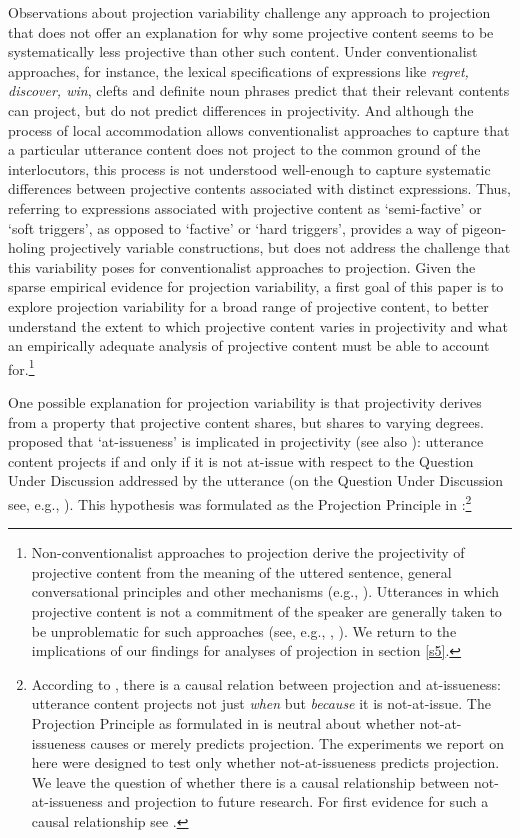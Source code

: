 \documentclass[11pt,fleqn]{article}
\newcommand{\6}{\mbox{$[\hspace*{-.6mm}[$}}
\newcommand{\9}{\mbox{$]\hspace*{-.6mm}]$}}
\begin{document}
Observations about projection variability challenge any approach to projection that does not offer an explanation for why some projective content seems to be systematically less projective than other such content. Under conventionalist approaches, for instance, the lexical specifications of expressions like {\em regret, discover, win}, clefts and definite noun phrases predict that their relevant contents can project, but do not predict differences in projectivity. And although the process of local accommodation allows conventionalist approaches to capture that a particular utterance content does not project to the common ground of the interlocutors, this process is not understood well-enough to capture systematic differences between projective contents associated with distinct expressions. Thus, referring to expressions associated with projective content as `semi-factive' or `soft triggers', as opposed to `factive' or `hard triggers', provides a way of pigeon-holing projectively variable constructions, but does not address the challenge that this variability poses for conventionalist approaches to projection.  Given the sparse empirical evidence for projection variability, a first goal of this paper is to explore projection variability for a broad range of projective content, to better understand the extent to which projective content varies in projectivity and what an empirically adequate analysis of projective content must be able to account for.\footnote{Non-conventionalist approaches to projection derive the projectivity of projective content from the meaning of the uttered sentence, general conversational principles and other mechanisms (e.g., \citealt{stalnaker74,kempson75,levinson83,simons01,abusch10,best-question}). Utterances in which projective content is not a commitment of the speaker are generally taken to be unproblematic for such approaches (see, e.g., \citealt[ch.4]{levinson83}, \citealt[ch.11]{kadmon01}). We return to  the implications of our findings for analyses of projection in section \ref{s5}.}

One possible explanation for projection variability is that projectivity derives from a property that projective content shares, but shares to varying degrees. \citet{brst-salt10} proposed that `at-issueness' is implicated in projectivity (see also \citealt{abrusan2011}): utterance content projects if and only if it is not at-issue with respect to the Question Under Discussion addressed by the utterance (on the Question Under Discussion see, e.g., \citealt{roberts12}). This hypothesis was formulated as the Projection Principle in \citealt[280]{brst-ar}:\footnote{According to \citealt[315]{brst-salt10}, there is a causal relation between projection and at-issueness: utterance content projects not just {\em when} but {\em because} it is not-at-issue. The Projection Principle as formulated in \citealt{brst-ar} is neutral about whether not-at-issueness causes or merely predicts projection. The experiments we report on here were designed to test only whether not-at-issueness predicts projection. We leave the question of whether there is a causal relationship between not-at-issueness and projection to future research. For first evidence for such a causal relationship see \citealt{tonhauser-salt26}.} 
\end{document}

